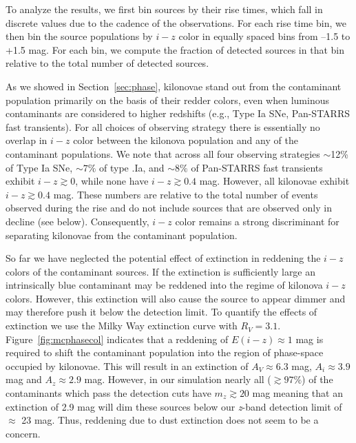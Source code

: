 To analyze the results, we first bin sources by their rise times, which fall in discrete values due to the cadence of the observations. For each rise time bin, we then bin the source populations by $i-z$ color in equally spaced bins from --1.5 to +1.5 mag. For each bin, we compute the fraction of detected sources in that bin relative to the total number of detected sources.

As we showed in Section~\ref{sec:phase}, kilonovae stand out from the contaminant population primarily on the basis of their redder colors, even when luminous contaminants are considered to higher redshifts (e.g., Type Ia SNe, Pan-STARRS fast transients). For all choices of observing strategy there is essentially no overlap in $i-z$ color between the kilonova population and any of the contaminant populations. We note that across all four observing strategies $\sim$12\% of Type Ia SNe, $\sim7\%$ of type .Ia, and $\sim8\%$ of Pan-STARRS fast transients exhibit $i-z\gtrsim 0$, while none have $i-z\gtrsim0.4$ mag. However, all kilonovae exhibit $i-z\gtrsim0.4$ mag. These numbers are relative to the total number of events observed during the rise and do not include sources that are observed only in decline (see below). Consequently, $i-z$ color remains a strong discriminant for separating kilonovae from the contaminant population. 
   
So far we have neglected the potential effect of extinction in reddening the $i-z$ colors of the contaminant sources. If the extinction is sufficiently large an intrinsically blue contaminant may be reddened into the regime of kilonova $i-z$ colors. However, this extinction will also cause the source to appear dimmer and may therefore push it below the detection limit. To quantify the effects of extinction we use the Milky Way extinction curve with $R_V = 3.1$. Figure~\ref{fig:mcphasecol} indicates that a reddening of $E(i-z) \approx 1$ mag is required to shift the contaminant population into the region of phase-space occupied by kilonovae. This will result in an extinction of $A_V \approx 6.3$ mag, $A_i \approx 3.9$ mag and $A_z \approx 2.9$ mag.  However, in our simulation nearly all ($\gtrsim 97\%$) of the contaminants which pass the detection cuts have $m_z \gtrsim 20$ mag meaning that an extinction of 2.9 mag will dim these sources below our {\em z}-band detection limit of $\approx$ 23 mag. Thus, reddening due to dust extinction does not seem to be a concern.
   
